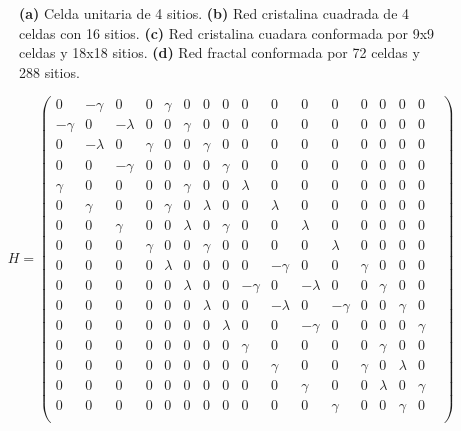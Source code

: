 \begin{figure}[h!]
        \caption{\textbf{(a)} Celda unitaria de 4 sitios. \textbf{(b)} Red cristalina cuadrada de 4 celdas con 16 sitios. \textbf{(c)} Red cristalina cuadara conformada por 9x9 celdas y 18x18 sitios. \textbf{(d)} Red fractal conformada por 72 celdas y 288 sitios. }
        \label{fig:three graphs}
\end{figure}
    
    \begin{equation} 
         H = 
     \begin{pmatrix}
        0 & -\gamma & 0 & 0 & \gamma & 0 & 0 & 0 & 0 & 0 & 0 & 0 & 0 & 0 & 0 & 0 & \\
        -\gamma & 0 & -\lambda & 0 &0 & \gamma & 0 & 0 & 0 & 0 & 0 & 0 & 0 & 0 & 0 & 0  \\
        0 & -\lambda & 0 & \gamma & 0 & 0 & \gamma & 0& 0 & 0 & 0 & 0 & 0 & 0 & 0 & 0 \\
        0 & 0 & -\gamma & 0 & 0 & 0 & 0 & \gamma  & 0 & 0 & 0 & 0 & 0 & 0 & 0 & 0 \\
        
        \gamma & 0 & 0 & 0 & 0 & \gamma & 0 & 0 & \lambda & 0 & 0 & 0 & 0 & 0 & 0 & 0 \\
        0 & \gamma & 0 & 0 & \gamma & 0 & \lambda & 0 & 0 & \lambda & 0 & 0 & 0 & 0 & 0 & 0 \\
        0 & 0 & \gamma & 0 & 0 & \lambda & 0 & \gamma & 0 & 0 & \lambda & 0 & 0 & 0 & 0 & 0 \\
        0 & 0 & 0 & \gamma & 0 & 0 & \gamma & 0 & 0 & 0 & 0 & \lambda & 0 &0 & 0 & 0 \\
        
        0 & 0 & 0 & 0 & \lambda & 0 & 0 & 0 & 0 & -\gamma & 0 & 0 & \gamma &0 & 0 & 0 \\
        0 & 0 & 0 & 0 & 0 & \lambda & 0 & 0 & -\gamma & 0 & -\lambda &  0 & 0 & \gamma & 0 & 0 \\
        0 & 0 & 0 & 0 & 0 & 0 & \lambda & 0 & 0 & -\lambda & 0 & -\gamma  &0 & 0 & \gamma & 0 \\
        0 & 0 & 0 & 0 & 0 & 0 & 0 & \lambda & 0 & 0 & -\gamma & 0 & 0 &0 & 0 & \gamma \\
        
        0 & 0 & 0 & 0 & 0 & 0 & 0 & 0 & \gamma & 0 & 0 & 0 & 0 & \gamma & 0 & 0 \\
        0 & 0 & 0 & 0 & 0 & 0 & 0 & 0 & 0 & \gamma & 0 & 0 & \gamma & 0 & \lambda & 0  \\
        0 & 0 & 0 & 0 & 0 & 0 & 0 & 0 & 0 & 0 & \gamma & 0 & 0 & \lambda & 0 & \gamma \\
        0 & 0 & 0 & 0 & 0 & 0 & 0 & 0 & 0 & 0 & 0 & \gamma & 0 & 0 & \gamma & 0 \\
        
    \end{pmatrix}
    \end{equation}
    
